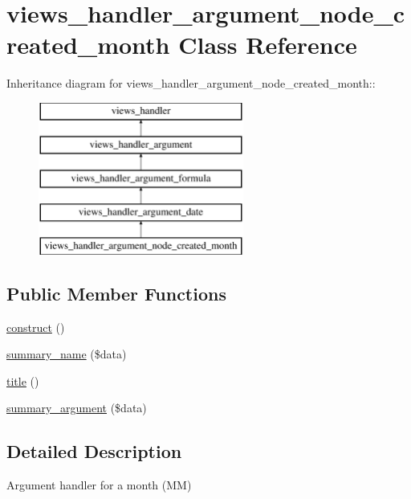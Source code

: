 \hypertarget{classviews__handler__argument__node__created__month}{
\section{views\_\-handler\_\-argument\_\-node\_\-created\_\-month Class Reference}
\label{classviews__handler__argument__node__created__month}
}
Inheritance diagram for views\_\-handler\_\-argument\_\-node\_\-created\_\-month::\begin{figure}[H]
\begin{center}
\leavevmode
\includegraphics[height=5cm]{classviews__handler__argument__node__created__month}
\end{center}
\end{figure}
\subsection*{Public Member Functions}
\begin{DoxyCompactItemize}
\item 
\hyperlink{classviews__handler__argument__node__created__month_a0f9b4da1f37a58ca3e416667dc8d9bbb}{construct} ()
\item 
\hyperlink{classviews__handler__argument__node__created__month_a1376f79ca0408659bea06caa51ce6da6}{summary\_\-name} (\$data)
\item 
\hyperlink{classviews__handler__argument__node__created__month_a3dbf8aaf46f210de7c29c36abfb7a2d6}{title} ()
\item 
\hyperlink{classviews__handler__argument__node__created__month_a4ecc9b35ee8ae4e8d61d18e83f1dfe82}{summary\_\-argument} (\$data)
\end{DoxyCompactItemize}


\subsection{Detailed Description}
Argument handler for a month (MM) 


